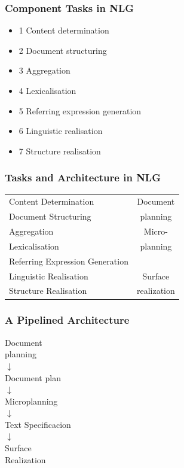 \documentclass[compress,color=usenames]{beamer}
\begin{document}
\begin{frame}
\frametitle{Component Tasks in NLG}

\label{f54}
\begin{itemize}
\item { {1 Content determination}}
\item { {2 Document structuring}}
\item { {3 Aggregation}}
\item { {4 Lexicalisation}}
\item { {5 Referring expression generation}}
\item { {6 Linguistic realisation}}
\item { {7 Structure realisation}}
\end{itemize}

\end{frame}

\begin{frame}
\frametitle{Tasks and Architecture in NLG}

\begin{center}
\begin{tabular}{|l|c|}  \hline
Content Determination & Document \\
Document Structuring &  planning\\ \hline
Aggregation &  Micro-\\
Lexicalisation & planning\\
Referring Expression Generation & \\ \hline
Linguistic Realisation & Surface\\
Structure Realisation & realization\\ \hline
\end{tabular}
\end{center}

\end{frame}

\begin{frame}
\frametitle{A Pipelined Architecture}

\begin{center}
Document\\
planning\\
$\downarrow$\\
Document plan\\
$\downarrow$\\
Microplanning\\
$\downarrow$\\
Text Specificacion\\
$\downarrow$\\
Surface\\
Realization
\end{center}

\end{frame}
\end{document}
